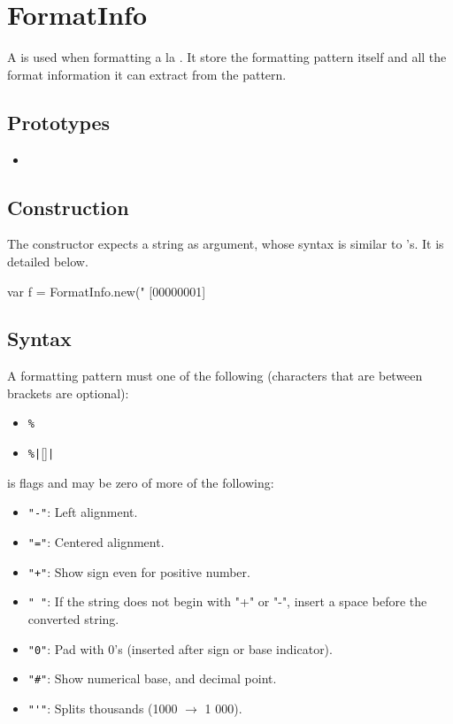 \section{FormatInfo}

A  is used when formatting a la . It
store the formatting pattern itself and all the format information it
can extract from the pattern.

\subsection{Prototypes}

\begin{itemize}
\item {}
\end{itemize}

\subsection{Construction}

The constructor expects a string as argument, whose syntax is similar
to 's.  It is detailed below.

\begin{urbiscript}
var f = FormatInfo.new("%
[00000001] %
\end{urbiscript}

\subsection{Syntax}

A formatting pattern must one of the following (characters that are
between brackets are optional):
\begin{itemize}
\item \verb&%& 
\item \verb&%|&[]\verb&|&
\end{itemize}

\noindent
{} is flags and may be zero of more of the following:
\begin{itemize}
\item \verb&"-"&: Left alignment.
\item \verb&"="&: Centered alignment.
\item \verb&"+"&: Show sign even for positive number.
\item \verb&" "&: If the string does not begin with "+" or "-", insert
  a space before the converted string.
\item \verb&"0"&: Pad with 0's (inserted after sign or base indicator).
\item \verb&"#"&: Show numerical base, and decimal point.
\item \verb&"'"&: Splits thousands (1000 $\rightarrow$ 1 000).
\end{itemize}

